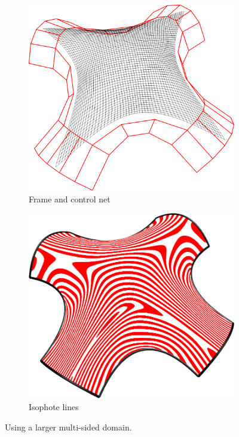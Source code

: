 \documentclass{article}
\begin{document}
\begin{figure}[h!]
  \label{fig:8sided}
  \centering
  \begin{subfigure}{0.3\textwidth}
    \label{fig:8sided-cnet}
    \includegraphics[width = \textwidth]{images/8sided-cnet.png}
    \caption{Frame and control net}
  \end{subfigure}
  \hspace{3cm}
  \begin{subfigure}{0.3\textwidth}
    \label{fig:8sided-iso}
    \includegraphics[width = \textwidth]{images/8sided-iso.png}
    \caption{Isophote lines}
  \end{subfigure}

  \caption{Using a larger multi-sided domain.}
\end{figure}
\end{document}
